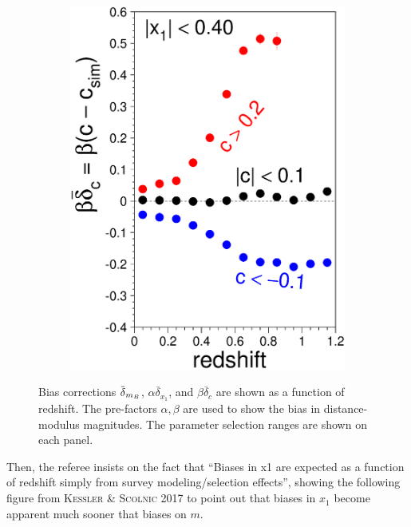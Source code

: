 \documentclass[11pt,a4paper]{paper}
\begin{document}
\begin{figure}
\begin{subfigure}[t]{.30\linewidth}
        \includegraphics[width=\linewidth]{Answer_figures/Fig_biasCor_c.eps}
    \end{subfigure}
    \captionsetup{justification=centering, size=scriptsize}
    \caption{Bias corrections $\mkern
        1.5mu\overline{\mkern-1.5mu\delta\mkern-1.5mu}\mkern 1.5mu_{m_B}$,
        $\alpha \overline{\delta}_{x_1}$, and $\beta\overline{\delta}_{c}$ are
        shown as a function of redshift. The pre-factors $\alpha, \beta$ are
        used to show the bias in distance-modulus magnitudes. The parameter
    selection ranges are shown on each panel.}
    \label{fig:KS17}
\end{figure}

Then, the referee insists on the fact that ``Biases in x1 are expected as a
function of redshift simply from survey modeling/selection effects'', showing
the following figure from \textsc{Kessler \& Scolnic 2017} to point out that
biases in $x_1$ become apparent much sooner that biases on $m$.
\end{document}
